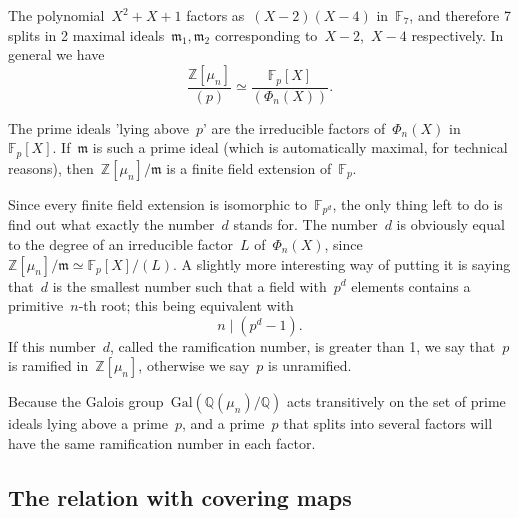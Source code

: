 The polynomial~${X^2 + X + 1}$ factors as~${(X-2)(X-4)}$ in~${\mathbb{F}_7}$, and therefore 7 splits in 2 maximal ideals~${\mathfrak{m}_1, \mathfrak{m}_2}$ corresponding to~${X-2}$,~${X-4}$ respectively. In general we have
\begin{equation}
  \frac{\mathbb{Z}[\mu_n]}{(p)} \simeq \frac{\mathbb{F}_p[X]}{(\Phi_n(X))}.
\end{equation}

The prime ideals 'lying above~${p}$' are the irreducible factors of~${\Phi_n(X)}$ in~${\mathbb{F}_p[X]}$. If~${\mathfrak{m}}$ is such a prime ideal (which is automatically maximal, for technical reasons), then~${\mathbb{Z}[\mu_n]/\mathfrak{m}}$ is a finite field extension of~${\mathbb{F}_p}$.

Since every finite field extension is isomorphic to~${\mathbb{F}_{p^d}}$, the only thing left to do is find out what exactly the number~${d}$ stands for. The number~${d}$ is obviously equal to the degree of an irreducible factor~${L}$ of~${\Phi_n(X)}$, since~${\mathbb{Z}[\mu_n]/\mathfrak{m}\simeq \mathbb{F}_p[X]/(L)}$. A slightly more interesting way of putting it is saying that~${d}$ is the smallest number such that a field with~${p^d}$ elements contains a primitive~${n}$-th root; this being equivalent with
\begin{equation}
  n \mid (p^d - 1) .
\end{equation}
If this number~${d}$, called the ramification number, is greater than 1, we say that~${p}$ is ramified in~${\mathbb{Z}[\mu_n]}$, otherwise we say~${p}$ is unramified.

Because the Galois group~${\mathrm{Gal}(\mathbb{Q}(\mu_n) / \mathbb{Q})}$ acts transitively on the set of prime ideals lying above a prime~${p}$, and a prime~${p}$ that splits into several factors will have the same ramification number in each factor.

\subsection{The relation with covering maps}


